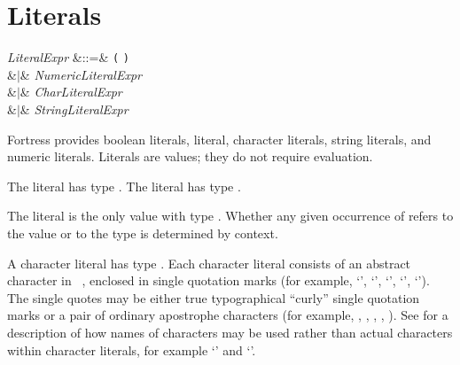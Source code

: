 %
%
%
%

\section{Literals}


\begin{Grammar}
\emph{LiteralExpr} &::=& \texttt{(} \texttt{)}\\
&$|$& \emph{NumericLiteralExpr}\\
&$|$& \emph{CharLiteralExpr}\\
&$|$& \emph{StringLiteralExpr}\\
\end{Grammar}

Fortress provides boolean literals, \TYP{()} literal, character literals,
string literals, and numeric literals.  Literals are values; they do not
require evaluation.


The literal  has type
.
The literal  has type
.

The literal \EXP{()} is the only value with type \TYP{()}.
Whether any given occurrence of \TYP{()} refers to the value \EXP{()} or
to the type \TYP{()} is determined by context.

A character literal has type .
Each character literal consists of an abstract character in
\unicode~\cite{Unicode},
enclosed in single quotation marks (for example, `', `',
`\txt{\$}', `\txt{$\alpha$}', `\txt{$\oplus$}').
The single quotes may be either true typographical ``curly'' single quotation marks
or a pair of ordinary apostrophe characters (for example, , , , , ).
See  for a description of how names of
characters may be used rather than actual characters within character literals,
for example `' and `'.


